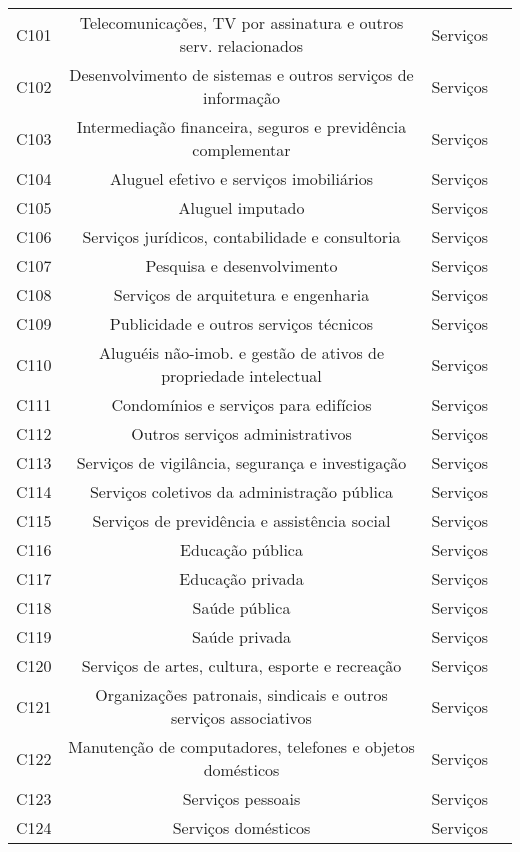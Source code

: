 \begin{apendicesenv}
\begin{small}
\begin{center}
\begin{longtable}{lccc}
				C101 & Telecomunicações, TV por assinatura e outros serv. relacionados & Serviços \\
				C102 & Desenvolvimento de sistemas e outros serviços de informação & Serviços \\
				C103 & Intermediação financeira, seguros e previdência complementar & Serviços \\
				C104 & Aluguel efetivo e serviços imobiliários & Serviços \\
				C105 & Aluguel imputado & Serviços \\
				C106 & Serviços jurídicos, contabilidade e consultoria & Serviços \\
				C107 & Pesquisa e desenvolvimento & Serviços \\
				C108 & Serviços de arquitetura e engenharia & Serviços \\
				C109 & Publicidade e outros serviços técnicos & Serviços \\
				C110 & Aluguéis não-imob. e gestão de ativos de propriedade intelectual & Serviços \\
				C111 & Condomínios e serviços para edifícios & Serviços \\
				C112 & Outros serviços administrativos & Serviços \\
				C113 & Serviços de vigilância, segurança e investigação & Serviços \\
				C114 & Serviços coletivos da administração pública & Serviços \\
				C115 & Serviços de previdência e assistência social & Serviços \\
				C116 & Educação pública & Serviços \\
				C117 & Educação privada & Serviços \\
				C118 & Saúde pública & Serviços \\
				C119 & Saúde privada & Serviços \\
				C120 & Serviços de artes, cultura, esporte e recreação & Serviços \\
				C121 & Organizações patronais, sindicais e outros serviços associativos & Serviços \\
				C122 & Manutenção de computadores, telefones e objetos domésticos & Serviços \\
				C123 & Serviços pessoais & Serviços \\
				C124 & Serviços domésticos & Serviços \\ \hline
			\end{longtable}
		\end{center}
	\end{small}




\end{apendicesenv}
